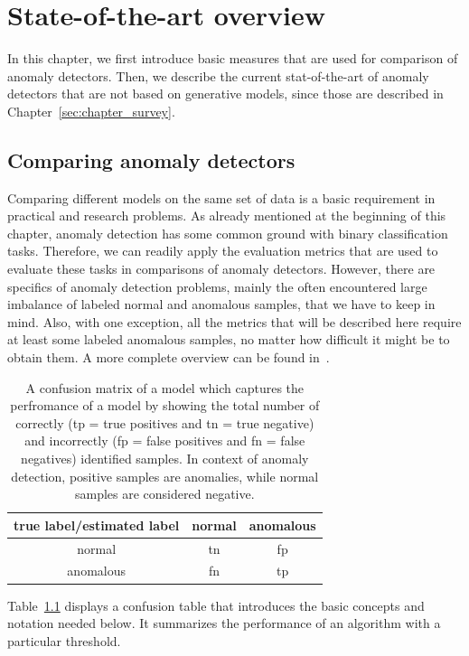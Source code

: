\chapter{State-of-the-art overview} \label{sec:chapter_shallow}
In this chapter, we first introduce basic measures that are used for comparison of anomaly detectors. Then, we describe the current stat-of-the-art of anomaly detectors that are not based on generative models, since those are described in Chapter~\ref{sec:chapter_survey}.

\section{Comparing anomaly detectors}
Comparing different models on the same set of data is a basic requirement in practical and research problems. As already mentioned at the beginning of this chapter, anomaly detection has some common ground with binary classification tasks. Therefore, we can readily apply the evaluation metrics that are used to evaluate these tasks in comparisons of anomaly detectors. However, there are specifics of anomaly detection problems, mainly the often encountered large imbalance of labeled normal and anomalous samples, that we have to keep in mind. Also, with one exception, all the metrics that will be described here require at least some labeled anomalous samples, no matter how difficult it might be to obtain them. A more complete overview can be found in~\cite{sokolova2006beyond}.

\begin{table}
\centering
	\begin{tabular}{c | c c}
		true label/estimated label & normal & anomalous \\
		\hline
		normal & tn & fp  \\
		anomalous & fn & tp 
	\end{tabular}
	\caption{A confusion matrix of a model which captures the perfromance of a model by showing the total number of correctly (tp = true positives and tn = true negative) and incorrectly (fp = false positives and fn = false negatives) identified samples. In context of anomaly detection, positive samples are anomalies, while normal samples are considered negative.}
	\label{tab:conf_ex}
\end{table}
Table~\ref{tab:conf_ex} displays a confusion table that introduces the basic concepts and notation needed below. It summarizes the performance of an algorithm with a particular threshold.

